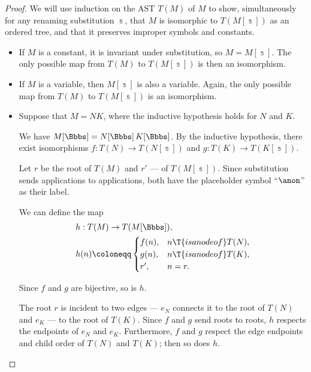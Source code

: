 \begin{proof}
  We will use induction  on the AST \( T(M) \) of \( M \) to show, simultaneously for any renaming substitution \( \Bbbs \), that \( M \) is isomorphic to \( T(M[\Bbbs]) \) as an ordered tree, and that it preserves improper symbols and constants.

  \begin{itemize}
    \item If \( M \) is a constant, it is invariant under substitution, so \( M = M[\Bbbs] \). The only possible map from \( T(M) \) to \( T(M[\Bbbs]) \) is then an isomorphism.

    \item If \( M \) is a variable, then \( M[\Bbbs] \) is also a variable. Again, the only possible map from \( T(M) \) to \( T(M[\Bbbs]) \) is an isomorphism.

    \item Suppose that \( M = NK \), where the inductive hypothesis holds for \( N \) and \( K \).

    We have \( M[\Bbbs] = N[\Bbbs] \thinspace K[\Bbbs] \). By the inductive hypothesis, there exist isomorphisms \( f: T(N) \to T(N[\Bbbs]) \) and \( g: T(K) \to T(K[\Bbbs]) \).

    Let \( r \) be the root of \( T(M) \) and \( r' \) --- of \( T(M[\Bbbs]) \). Since substitution sends applications to applications, both have the placeholder symbol \enquote{\( \anon \)} as their label.

    We can define the map
    \begin{equation*}
      \begin{aligned}
        &h: T(M) \to T(M[\Bbbs]), \\
        &h(n) \coloneqq \begin{cases}
          f(n), &n \T{is a node of} T(N), \\
          g(n), &n \T{is a node of} T(K), \\
          r',   &n = r.
        \end{cases}
      \end{aligned}
    \end{equation*}

    Since \( f \) and \( g \) are bijective, so is \( h \).

    The root \( r \) is incident to two edges --- \( e_N \) connects it to the root of \( T(N) \) and \( e_K \) --- to the root of \( T(K) \). Since \( f \) and \( g \) send roots to roots, \( h \) respects the endpoints of \( e_N \) and \( e_K \). Furthermore, \( f \) and \( g \) respect the edge endpoints and child order of \( T(N) \) and \( T(K) \); then so does \( h \).


\end{itemize}
\end{proof}
